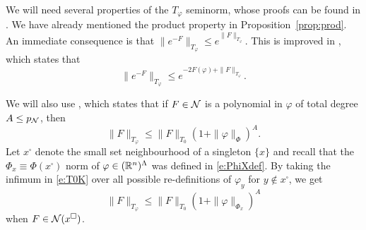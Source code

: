 We will need several properties of the $T_\varphi$ seminorm, whose proofs can be found in
\cite{BS-rg-norm}. We have already mentioned the product property in Proposition~\ref{prop:prod}.
An immediate consequence is that $\|e^{-F}\|_{T_\varphi} \leq e^{\|F\|_{T_\varphi}}$.
This is improved in \cite[Proposition~\ref{norm-prop:eK}]{BS-rg-norm},
which states that
\begin{equation}
\label{e:eK}
\|e^{-F}\|_{T_\varphi} \leq e^{-2 F(\varphi) + \|F\|_{T_\varphi}}.
\end{equation}

We will also use \cite[Proposition~\ref{norm-prop:T0K}]{BS-rg-norm},
which states that if $F \in \mathcal{N}$ is a polynomial in $\varphi$ of
total degree $A \leq p_{\mathcal{N}}$, then
\begin{equation}
\label{e:T0K}
\|F\|_{T_\varphi} \leq \|F\|_{T_0} (1 + \|\varphi\|_\Phi)^A.
\end{equation}
Let $x^\square$ denote the small set neighbourhood of a singleton $\{x\}$
and recall that
the $\Phi_x \equiv \Phi(x^\square)$ norm of $\varphi \in ({\mathbb R}^n)^\Lambda$ was defined
in \eqref{e:PhiXdef}.
By taking the infimum in \eqref{e:T0K} over all possible
re-definitions of $\varphi_y$ for $y \notin x^\square$, we get
\begin{equation}
\label{e:T0Kx}
\|F\|_{T_\varphi}
  \leq
\|F\|_{T_0} (1 + \|\varphi\|_{\Phi_x})^A
\end{equation}
when $F \in \mathcal{N}(x^\square)$.

